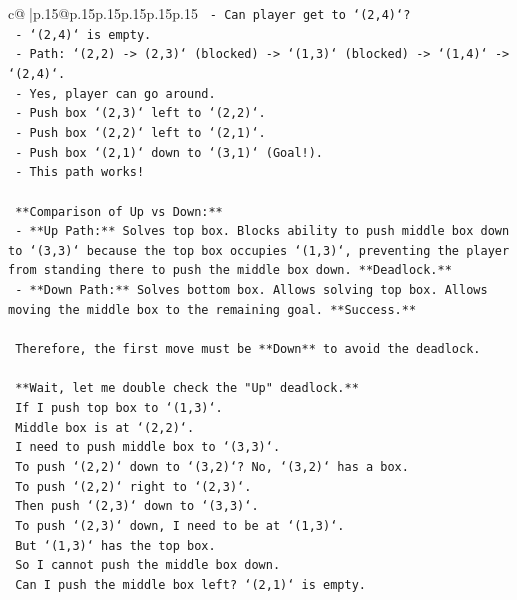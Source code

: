 \documentclass{article}
\begin{document}
{\begin{supertabular}{c@{$\;$}|p{.15\linewidth}@{}p{.15\linewidth}p{.15\linewidth}p{.15\linewidth}p{.15\linewidth}p{.15\linewidth}}
{{{\texttt{       {-} Can player get to `(2,4)`?} \\
\texttt{       {-} `(2,4)` is empty.} \\
\texttt{       {-} Path: `(2,2) {-}> (2,3)` (blocked) {-}> `(1,3)` (blocked) {-}> `(1,4)` {-}> `(2,4)`.} \\
\texttt{       {-} Yes, player can go around.} \\
\texttt{       {-} Push box `(2,3)` left to `(2,2)`.} \\
\texttt{       {-} Push box `(2,2)` left to `(2,1)`.} \\
\texttt{       {-} Push box `(2,1)` down to `(3,1)` (Goal!).} \\
\texttt{       {-} This path works!} \\
\\ 
\texttt{    **Comparison of Up vs Down:**} \\
\texttt{    {-} **Up Path:** Solves top box. Blocks ability to push middle box down to `(3,3)` because the top box occupies `(1,3)`, preventing the player from standing there to push the middle box down. **Deadlock.**} \\
\texttt{    {-} **Down Path:** Solves bottom box. Allows solving top box. Allows moving the middle box to the remaining goal. **Success.**} \\
\\ 
\texttt{    Therefore, the first move must be **Down** to avoid the deadlock.} \\
\\ 
\texttt{    **Wait, let me double check the "Up" deadlock.**} \\
\texttt{    If I push top box to `(1,3)`.} \\
\texttt{    Middle box is at `(2,2)`.} \\
\texttt{    I need to push middle box to `(3,3)`.} \\
\texttt{    To push `(2,2)` down to `(3,2)`? No, `(3,2)` has a box.} \\
\texttt{    To push `(2,2)` right to `(2,3)`.} \\
\texttt{    Then push `(2,3)` down to `(3,3)`.} \\
\texttt{    To push `(2,3)` down, I need to be at `(1,3)`.} \\
\texttt{    But `(1,3)` has the top box.} \\
\texttt{    So I cannot push the middle box down.} \\
\texttt{    Can I push the middle box left? `(2,1)` is empty.} \\
}}}
\end{supertabular}}
\end{document}
